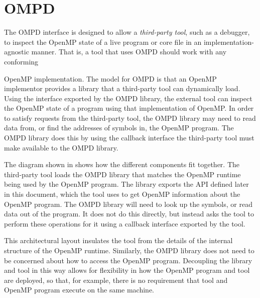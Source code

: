 \section{OMPD}
\label{sec:ompd-overview}
\label{sec:third-party-tool-callback-interface}

The OMPD interface is designed to allow a \emph{third-party tool},
such as a debugger, to inspect the OpenMP state of a live program
or core file in an implementation-agnostic manner.
That is, a tool that uses OMPD should work with any conforming

OpenMP implementation.
The model for OMPD is that an OpenMP implementor provides a
library that a third-party tool can dynamically load.
Using the interface exported by the OMPD library, the external tool can
inspect the OpenMP state of a program using that implementation of OpenMP.
In order to satisfy requests from the third-party tool, the OMPD library
may need to read data from, or find the addresses of symbols in,
the OpenMP program.
The OMPD library does this by using the callback interface the third-party
tool must make available to the OMPD library.

%


The diagram shown in   shows how the different
components fit together.
The third-party tool loads the OMPD library that matches the OpenMP runtime
being used by the OpenMP program.
The library exports the API defined later in this document,
which the tool uses to get OpenMP information about the OpenMP program.
The OMPD library will need to look up the symbols,
or read data out of the program.
It does not do this directly, but instead asks the tool to perform
these operations for it using a callback interface exported by the tool.

This architectural layout insulates the tool from the details
of the internal structure of the OpenMP runtime.
Similarly, the OMPD library does not need to be concerned about
how to access the OpenMP program.
Decoupling the library and tool in this way allows for
flexibility in how the OpenMP program and tool are deployed,
so that, for example, there is no requirement that tool
and OpenMP program execute on the same machine.

